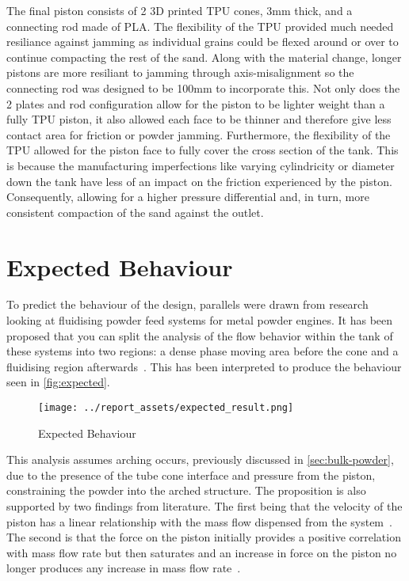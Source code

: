 The final piston consists of 2 3D printed TPU cones, 3mm thick, and a connecting rod made of PLA. The flexibility of the TPU provided much needed resiliance against jamming as individual grains could be flexed around or over to continue compacting the rest of the sand. Along with the material change, longer pistons are more resiliant to jamming through axis-misalignment so the connecting rod was designed to be 100mm to incorporate this. Not only does the 2 plates and rod configuration allow for the piston to be lighter weight than a fully TPU piston, it also allowed each face to be thinner and therefore give less contact area for friction or powder jamming. Furthermore, the flexibility of the TPU allowed for the piston face to fully cover the cross section of the tank. This is because the manufacturing imperfections like varying cylindricity or diameter down the tank have less of an impact on the friction experienced by the piston. Consequently, allowing for a higher pressure differential and, in turn, more consistent compaction of the sand against the outlet.

\section{Expected Behaviour}
To predict the behaviour of the design, parallels were drawn from research looking at fluidising powder feed systems for metal powder engines. It has been proposed that you can split the analysis of the flow behavior within the tank of these systems into two regions: a dense phase moving area before the cone and a fluidising region afterwards~\cite{Tang22}. This has been interpreted to produce the behaviour seen in \autoref{fig:expected}. 
\begin{figure}[htbp]
    \centering
    
    \begin{minipage}{0.6\textwidth}
        \centering
        \texttt{[image: ../report\_assets/expected\_result.png]}
        \caption{Expected Behaviour}\label{fig:expected}
    \end{minipage}
    
\end{figure}
This analysis assumes arching occurs, previously discussed in \autoref{sec:bulk-powder}, due to the presence of the tube cone interface and pressure from the piston, constraining the powder into the arched structure. The proposition is also supported by two findings from literature. The first being that the velocity of the piston has a linear relationship with the mass flow dispensed from the system~\cite{SUN201630}. The second is that the force on the piston initially provides a positive correlation with mass flow rate but then saturates and an increase in force on the piston no longer produces any increase in mass flow rate~\cite{LI2021712}. 

